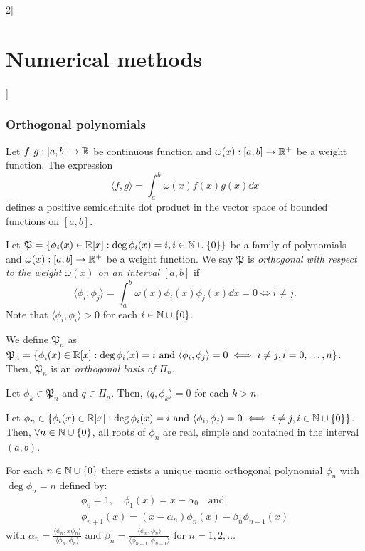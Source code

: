 \documentclass[../../../main.tex]{subfiles}
\begin{document}
\begin{multicols}{2}[\section{Numerical methods}]
\subsubsection*{Orthogonal polynomials}
\begin{definition}
    Let $f,g:[a,b]\rightarrow\mathbb{R}$ be continuous function and $\omega(x):[a,b]\rightarrow\mathbb{R}^+$ be a weight function. The expression $$\langle f,g\rangle=\int_a^b\omega(x)f(x)g(x)\dd x$$ defines a positive semidefinite dot product in the vector space of bounded functions on $[a,b]$.
\end{definition}
\begin{definition}
    Let $\mathfrak{P}=\{\phi_i(x)\in\mathbb{R}[x]:\deg \phi_i(x)=i, i\in\mathbb{N}\cup\{0\}\}$ be a family of polynomials and $\omega(x):[a,b]\rightarrow\mathbb{R}^+$ be a weight function. We say $\mathfrak{P}$ is \textit{orthogonal with respect to the weight $\omega(x)$ on an interval $[a,b]$} if $$\langle \phi_i,\phi_j\rangle=\int_a^b\omega(x)\phi_i(x)\phi_j(x)\dd x=0\iff i\ne j.$$
    Note that $\langle \phi_i,\phi_i\rangle>0$ for each $i\in\mathbb{N}\cup\{0\}$.
\end{definition}
\begin{lemma}
    We define $\mathfrak{P}_n$ as $\mathfrak{P}_n=\{\phi_i(x)\in\mathbb{R}[x]:\deg\phi_i(x)=i\text{ and }\langle \phi_i,\phi_j\rangle=0\iff i\ne j,  i=0,\ldots,n\}$. Then, $\mathfrak{P}_n$ is an \textit{orthogonal basis of $\Pi_n$}. 
\end{lemma}
\begin{lemma}
    Let $\phi_k\in\mathfrak{P}_n$ and $q\in\Pi_n$. Then, $\langle q,\phi_k\rangle=0$ for each $k>n$.
\end{lemma}
\begin{lemma}
    Let $\phi_n\in\{\phi_i(x)\in\mathbb{R}[x]:\deg\phi_i(x)=i\text{ and }\langle \phi_i,\phi_j\rangle=0\iff i\ne j,  i\in\mathbb{N}\cup\{0\}\}$. Then, $\forall n\in\mathbb{N}\cup\{0\}$, all roots of $\phi_n$ are real, simple and contained in the interval $(a,b)$.
\end{lemma}
\begin{theorem}
    For each $n\in\mathbb{N}\cup\{0\}$ there exists a unique monic orthogonal polynomial $\phi_n$ with $\deg\phi_n=n$ defined by:
    \begin{gather*}
        \phi_0=1,\quad\phi_1(x)=x-\alpha_0\quad \text{and}\\
        \phi_{n+1}(x)=(x-\alpha_n)\phi_n(x)-\beta_n\phi_{n-1}(x)
    \end{gather*}
    with $\alpha_n=\frac{\langle\phi_n,x\phi_n\rangle}{\langle\phi_n,\phi_n\rangle}$ and $\beta_n=\frac{\langle\phi_n,\phi_n\rangle}{\langle\phi_{n-1},\phi_{n-1}\rangle}$ for $n=1,2,\ldots$

\end{theorem}
\end{multicols}
\end{document}
